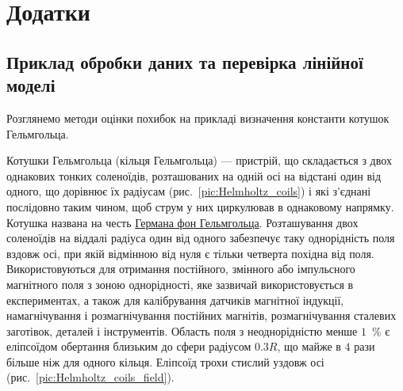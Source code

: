 \documentclass{LabBook}
\edef\infile{ExpData.dat}
\begin{document}


  \setcounter{chapter}{1}
  \setcounter{section}{0}
  \pagestyle{addition}
  \renewcommand{\thesection}{\Asbuk{section}}
  \chapter*{Додатки}


\section{Приклад обробки даних та перевірка лінійної моделі}
  \pgfplotstableread[]{\infile}\datatable


  Розглянемо методи оцінки похибок на прикладі визначення константи котушок Гельмгольца.

  Котушки Гельмгольца (кільця Гельмгольца) --- пристрій, що складається з двох однакових тонких соленоїдів, розташованих на одній осі на відстані один від одного, що дорівнює їх радіусам (рис.~\ref{pic:Helmholtz_coils}) і які з'єднані послідовно таким чином, щоб струм у них циркулював в однаковому напрямку. Котушка названа на честь \href{https://en.wikipedia.org/wiki/Hermann_von_Helmholtz}{Германа фон Гельмгольца}. Розташування двох соленоїдів на віддалі радіуса один від одного забезпечує таку однорідність поля вздовж осі, при якій відмінною від нуля є тільки четверта похідна від поля. Використовуються для отримання постійного, змінного або імпульсного магнітного поля з зоною однорідності, яке зазвичай використовується в експериментах, а також для калібрування датчиків магнітної індукції, намагнічування і розмагнічування постійних магнітів, розмагнічування сталевих заготівок, деталей і інструментів. Область поля з неоднорідністю менше $1$~\% є еліпсоїдом обертання близьким до сфери радіусом $0.3R$, що майже в $4$ рази більше ніж для одного кільця. Еліпсоїд трохи стислий уздовж осі (рис.~\ref{pic:Helmholtz_coils_field}).
\end{document}
